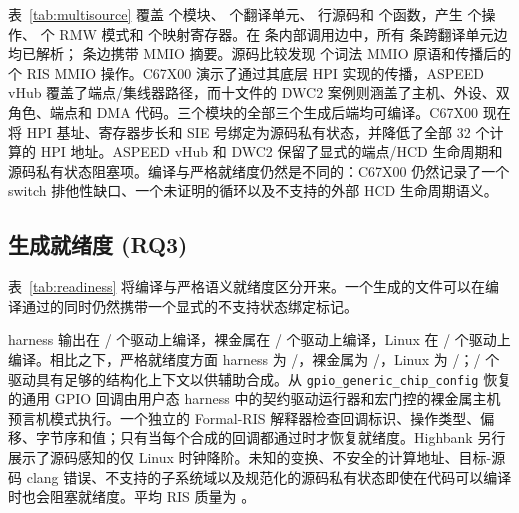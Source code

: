 \documentclass[sigplan, screen, review, anonymous]{acmart}
\begin{document}
\begin{table}[t]
\centering
\caption{真实多源 Linux 驱动模块。X-TU 是已解析的跨翻译单元调用边数，Prop 是携带 MMIO 摘要的调用边数。H/B/L 报告生成的后端编译情况。$\dagger$ 表示在仅警告的 modpost 重试后成功的原始 Kbuild 编译/链接，因为固定的实验内核省略了 USB 核心导出。}
\label{tab:multisource}
\resizebox{\columnwidth}{!}{\MultiSourceResultsTable}
\end{table}

表~\ref{tab:multisource} 覆盖 \MultiSourceDrivers{} 个模块、\MultiSourceTUs{} 个翻译单元、\MultiSourceLines{} 行源码和 \MultiSourceFunctions{} 个函数，产生 \MultiSourceOps{} 个操作、\MultiSourceRMW{} 个 RMW 模式和 \MultiSourceRegisters{} 个映射寄存器。在 \MultiSourceCallEdges{} 条内部调用边中，所有 \MultiSourceCrossTUEdges{} 条跨翻译单元边均已解析；\MultiSourcePropagatedEdges{} 条边携带 MMIO 摘要。源码比较发现 \MultiSourceSourceMMIO{} 个词法 MMIO 原语和传播后的 \MultiSourceRISMMIO{} 个 RIS MMIO 操作。C67X00 演示了通过其底层 HPI 实现的传播，ASPEED vHub 覆盖了端点/集线器路径，而十文件的 DWC2 案例则涵盖了主机、外设、双角色、端点和 DMA 代码。三个模块的全部三个生成后端均可编译。C67X00 现在将 HPI 基址、寄存器步长和 SIE 号绑定为源码私有状态，并降低了全部 32 个计算的 HPI 地址。ASPEED vHub 和 DWC2 保留了显式的端点/HCD 生命周期和源码私有状态阻塞项。编译与严格就绪度仍然是不同的：C67X00 仍然记录了一个 switch 排他性缺口、一个未证明的循环以及不支持的外部 HCD 生命周期语义。

\subsection{生成就绪度 (RQ3)}

表~\ref{tab:readiness} 将编译与严格语义就绪度区分开来。一个生成的文件可以在编译通过的同时仍然携带一个显式的不支持状态绑定标记。

\begin{table}[t]
\centering
\caption{每个驱动的生成就绪度评分。}
\label{tab:readiness}
\resizebox{\columnwidth}{!}{\ReadinessResultsTable}
\end{table}

harness 输出在 \HarnessCompileCount{}/\EvalDrivers{} 个驱动上编译，裸金属在 \BaremetalCompileCount{}/\EvalDrivers{} 个驱动上编译，Linux 在 \LinuxCompileCount{}/\EvalDrivers{} 个驱动上编译。相比之下，严格就绪度方面 harness 为 \HarnessReadyCount{}/\EvalDrivers{}，裸金属为 \BaremetalReadyCount{}/\EvalDrivers{}，Linux 为 \LinuxReadyCount{}/\EvalDrivers{}；\LLMReadyCount{}/\EvalDrivers{} 个驱动具有足够的结构化上下文以供辅助合成。从 \texttt{gpio\_generic\_chip\_config} 恢复的通用 GPIO 回调由用户态 harness 中的契约驱动运行器和宏门控的裸金属主机预言机模式执行。一个独立的 Formal-RIS 解释器检查回调标识、操作类型、偏移、字节序和值；只有当每个合成的回调都通过时才恢复就绪度。Highbank 另行展示了源码感知的仅 Linux 时钟降阶。未知的变换、不安全的计算地址、目标-源码 clang 错误、不支持的子系统域以及规范化的源码私有状态即使在代码可以编译时也会阻塞就绪度。平均 RIS 质量为 \EvalMeanRIS{}。
\end{document}
